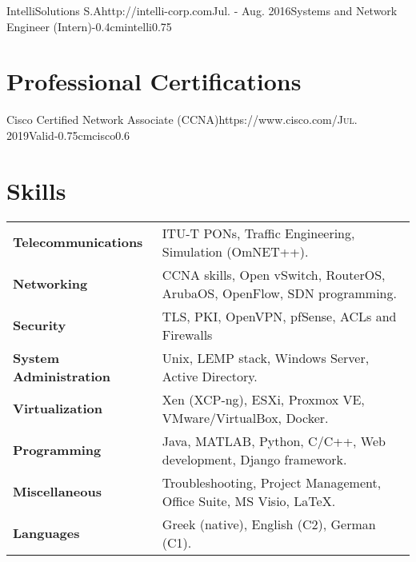 \documentclass{mycv}
\begin{document}
	\vspace*{0.75cm}	

	\begin{EntryDatedLogo}{IntelliSolutions S.A}{http://intelli-corp.com}{Jul. - Aug. 2016}{Systems and Network Engineer (Intern)}{-0.4cm}{intelli}{0.75}
	\end{EntryDatedLogo}
	\newpage
	
	\section{Professional Certifications}
	\begin{EntryDatedLogo}{Cisco Certified Network Associate (CCNA)}{https://www.cisco.com/}{\scshape{Jul. 2019}}{Valid}{-0.75cm}{cisco}{0.6}
	\end{EntryDatedLogo}
	
	\section{Skills}
	\begin{tabular}{m{4.5cm} m{13cm}}\renewcommand{\arraystretch}{2}
		\textbf{Telecommunications}   	& ITU-T PONs, Traffic Engineering, Simulation (OmNET++). \\
		\textbf{Networking}   			& CCNA skills, Open vSwitch, RouterOS, ArubaOS, OpenFlow, SDN programming.\\
		\textbf{Security}				& TLS, PKI, OpenVPN, pfSense, ACLs and Firewalls \\
		\textbf{System Administration}	& Unix, LEMP stack, Windows Server, Active Directory. \\
		\textbf{Virtualization}			& Xen (XCP-ng), ESXi, Proxmox VE, VMware/VirtualBox, Docker.\\ 
		\textbf{Programming} 	    	& Java, MATLAB, Python, C/C++, Web development, Django framework. \\
		\textbf{Miscellaneous}			& Troubleshooting, Project Management, Office Suite, MS Visio, \LaTeX. \\
		\textbf{Languages} 				& Greek (native), English (C2), German (C1). 
	\end{tabular}
\end{document}
